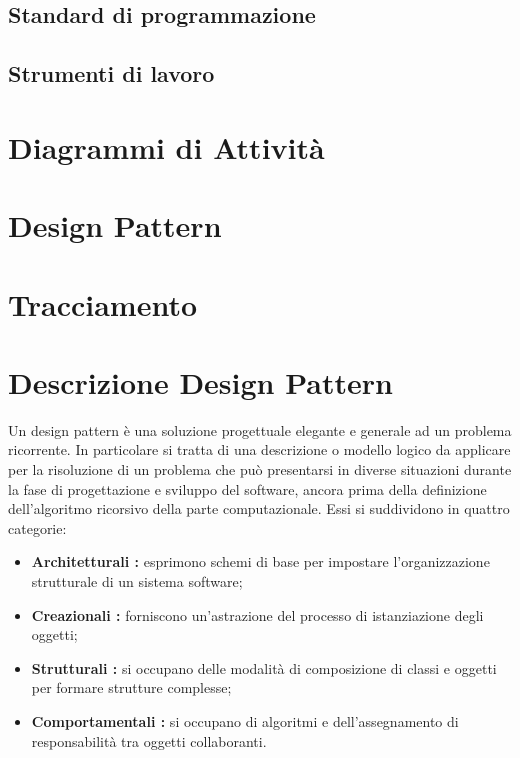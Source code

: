 \subsection{Standard di programmazione}

\subsection{Strumenti di lavoro}


\section{Diagrammi di Attività}


\section{Design Pattern}

\section{Tracciamento}




\appendix



\section{Descrizione Design Pattern}

Un design pattern è una soluzione progettuale elegante e generale ad un problema ricorrente. In particolare si tratta di una descrizione o modello logico da applicare per la risoluzione di un problema che può presentarsi in diverse situazioni durante la fase di progettazione e sviluppo del software, ancora prima della definizione dell'algoritmo ricorsivo della parte computazionale. Essi si suddividono in quattro categorie: \

\begin{itemize}
	\item \textbf{Architetturali :} esprimono schemi di base per impostare l'organizzazione strutturale di un sistema software;
	\item \textbf{Creazionali :} forniscono un'astrazione del processo di istanziazione degli oggetti;
	\item \textbf{Strutturali :} si occupano delle modalità di composizione di classi e oggetti per formare strutture complesse;
	\item \textbf{Comportamentali :} si occupano di algoritmi e dell'assegnamento di responsabilità tra oggetti collaboranti.

\end{itemize}

